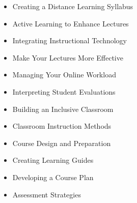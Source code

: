 \documentclass[letterpaper,11pt]{article}
\begin{document}
\begin{itemize}
\begin{itemize}
	    \item  Creating a Distance Learning Syllabus
		\item  Active Learning to Enhance Lectures
	    \item  Integrating Instructional Technology
		\item  Make Your Lectures More Effective
		\item  Managing Your Online Workload
		\item  Interpreting Student Evaluations
		\item  Building an Inclusive Classroom
		\item  Classroom Instruction Methods
		\item  Course Design and Preparation
		\item  Creating Learning Guides
		\item  Developing a Course Plan
		\item  Assessment Strategies
	\end{itemize}
\end{itemize}
\end{document}

